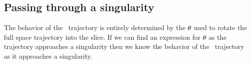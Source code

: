 


    \fi %

\subsection{Passing through a singularity}
\label{sect:passingSing}

The behavior of the \reducedsp\ trajectory is entirely determined by the ${\bf \theta}$ used to rotate the full space trajectory into the slice. If we can find an expression for ${\bf \theta}$ as the trajectory approaches a singularity then we know the behavior of the \reducedsp\ trajectory as it approaches a singularity.

